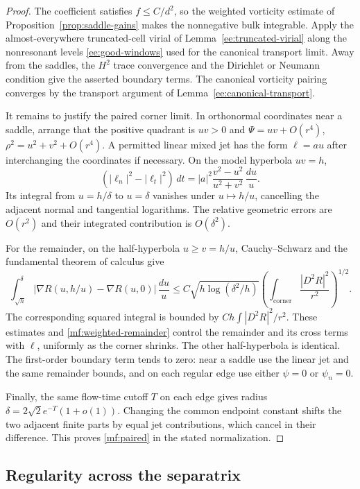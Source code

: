\documentclass[reqno,11pt]{amsart}
\numberwithin{equation}{section}
\theoremstyle{remark}
\begin{document}
\begin{proof}
The coefficient satisfies $f\le C/d^2$, so the weighted vorticity
estimate of Proposition~\ref{prop:saddle-gains} makes the
nonnegative bulk integrable. Apply the almost-everywhere
truncated-cell virial of Lemma~\ref{ee:truncated-virial} along the
nonresonant levels \eqref{ee:good-windows} used for the canonical
transport limit. Away from the
saddles, the $H^2$ trace convergence and the Dirichlet or Neumann
condition give the asserted boundary terms. The canonical
vorticity pairing converges by the transport argument of
Lemma~\ref{ee:canonical-transport}.

It remains to justify the paired corner limit. In orthonormal
coordinates near a saddle, arrange that the positive quadrant is
$uv>0$ and
$\Psi=uv+O(r^4)$, $\rho^2=u^2+v^2+O(r^4)$.
A permitted linear mixed jet has the form $\ell=a u$ after
interchanging the coordinates if necessary. On the model
hyperbola $uv=h$,
\[
 (|\ell_n|^2-|\ell_t|^2)\,dt
       =|a|^2\frac{v^2-u^2}{u^2+v^2}\,\frac{du}{u}.
\]
Its integral from $u=h/\delta$ to $u=\delta$ vanishes under
$u\mapsto h/u$, cancelling the adjacent normal and tangential
logarithms. The relative geometric errors are
$O(r^2)$ and their integrated contribution is $O(\delta^2)$.

For the remainder, on the half-hyperbola $u\ge v=h/u$,
Cauchy--Schwarz and the fundamental theorem of calculus give
\[
 \int_{\sqrt h}^{\delta}
  |\nabla R(u,h/u)-\nabla R(u,0)|\,\frac{du}{u}
 \le C\sqrt{h\log(\delta^2/h)}
       \left(\int_{\mathrm{corner}}\frac{|D^2R|^2}{r^2}\right)^{1/2}.
\]
The corresponding squared integral is bounded by
$Ch\int |D^2R|^2/r^2$. These estimates and
\eqref{mf:weighted-remainder} control the remainder and its cross
terms with $\ell$, uniformly as the corner shrinks. The other
half-hyperbola is identical. The first-order boundary term tends
to zero: near a saddle use the linear jet and the same remainder
bounds, and on each regular edge use either $\psi=0$ or
$\psi_n=0$.

Finally, the same flow-time cutoff $T$ on each edge gives radius
$\delta=2\sqrt2e^{-T}(1+o(1))$. Changing the common endpoint
constant shifts the two adjacent finite parts by equal jet
contributions, which cancel in their difference. This proves
\eqref{mf:paired} in the stated normalization.
\end{proof}

\subsection{Regularity across the separatrix}
\label{sec:mixed-quotient-domain}
\end{document}
